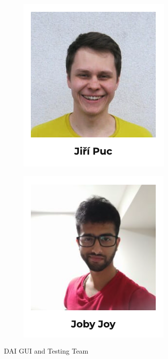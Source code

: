 \documentclass[12pt,a4paper]{report}
\begin{document}
\begin{figure}[H]

\begin{subfigure}[h]{0.5\textwidth}
\centering
\includegraphics[width=0.9\linewidth]{jiri.png}
\end{subfigure}
\hfill
\begin{subfigure}[h]{0.5\textwidth}
\centering
\includegraphics[width=0.9\linewidth]{joby.png}
\end{subfigure}

\caption{\ac{DAI} \ac{GUI} and Testing Team}
\end{figure}
\end{document}
